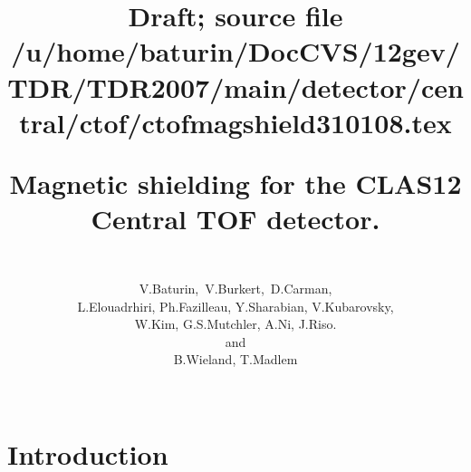 \documentclass[12pt]{article}
\begin{document}
\pagestyle{plain}
%
%
%
%
\title
{
\vspace{-1.4cm}
\begin{flushright}
\normalsize{Draft; source file /u/home/baturin/DocCVS/12gev/TDR/TDR2007/main/detector/central/ctof/ctofmagshield310108.tex}
\nopagebreak
\end{flushright}Magnetic shielding for the CLAS12 Central TOF detector.}
\author
{
{}\\
\mbox
{V.Baturin, V.Burkert, D.Carman,} \\
{ L.Elouadrhiri, Ph.Fazilleau, Y.Sharabian, V.Kubarovsky,} \\
{W.Kim, G.S.Mutchler, A.Ni, J.Riso.} \\
{and} \\
{ B.Wieland, T.Madlem}
\mbox
{}\\
{}\\
}
\maketitle




\tableofcontents
\newpage
\listoftables
\newpage
\listoffigures
\newpage
\section{Introduction}
\end{document}
